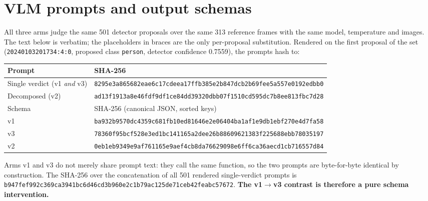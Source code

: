 %

\section{VLM prompts and output schemas}
\label{app:prompts}

All three arms judge the same 501 detector proposals over the same 313 reference
frames with the same model, temperature and images. The text below is verbatim;
the placeholders in braces are the only per-proposal substitution. Rendered on
the first proposal of the set (\texttt{20240103201734:4:0}, proposed class
\texttt{person}, detector confidence 0.7559), the prompts hash to:

\begin{center}
\scriptsize
\begin{tabular}{ll}
\toprule
Prompt & SHA-256 \\
\midrule
Single verdict (v1 \emph{and} v3) & \texttt{8295e3a865682eae6c17cdeea17ffb385e2b847dcb2b69fee5a557e0192edbb0} \\
Decomposed (v2)                   & \texttt{ad13f1913a8e46fdf9df1ce84dd39320dbb07f1510cd595dc7b8ee813fbc7d28} \\
\midrule
Schema & SHA-256 (canonical JSON, sorted keys) \\
\midrule
v1 & \texttt{ba932b9570dc4359c681fb10ed81646e2e06404ba1af1e9db1ebf270e4d7fa58} \\
v3 & \texttt{78360f95bcf528e3ed1bc141165a2dee26b88609621383f225688ebb78035197} \\
v2 & \texttt{0eb1eb9349e9af761165e9aef4cb8da76629098e6ff6ca36aecd1cb716557d84} \\
\bottomrule
\end{tabular}
\end{center}

\noindent
Arms v1 and v3 do not merely share prompt text: they call the same function, so
the two prompts are byte-for-byte identical by construction. The SHA-256 over
the concatenation of all 501 rendered single-verdict prompts is
\texttt{b947fef992c369ca3941bc6d46cd3b960e2c1b79ac125de71ceb42feabc57672}.
\textbf{The v1$\to$v3 contrast is therefore a pure schema intervention.}

